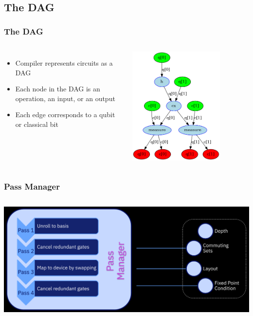\documentclass[aspectratio=169,11pt,hyperref={colorlinks=true}]{beamer}
\begin{document}
\subsection{The DAG}
\begin{frame}
    \frametitle{The DAG}
        \begin{columns}
                \begin{itemize}
                    \item Compiler represents circuits as a DAG
                    \item Each node in the DAG is an operation, an input, or
                          an output
                    \item Each edge corresponds to a qubit or classical bit
                \end{itemize}
                \centering
                \includegraphics[width=0.75\textwidth]{bell-dag.png}
        \end{columns}
\end{frame}
\begin{frame}
    \frametitle{Pass Manager}
    \begin{columns}

            \includegraphics[width=\textwidth]{passmanager.png}
    \end{columns}
\end{frame}
\end{document}
